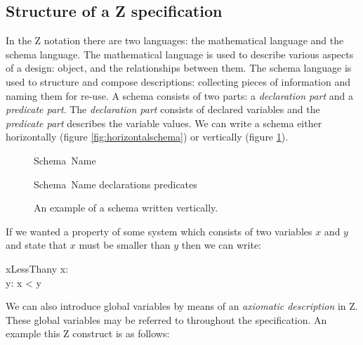 \subsection{Structure of a Z specification}

In the Z notation there are two languages: the mathematical language and the
schema language. The mathematical language is used to describe various aspects
of a design: object, and the relationships between them. The schema language is
used to structure and compose descriptions: collecting pieces of information and
naming them for re-use. A schema consists of two parts: a \emph{declaration
part} and a \emph{predicate part}. The \emph{declaration part} consists of
declared variables and the \emph{predicate part} describes the variable values.
We can write a schema either horizontally (figure \ref{fig:horizontalschema}) or
vertically (figure \ref{fig:verticalschema}).

\begin{figure}[H]
\vspace{-0.2in}
\centering
\begin{minipage}{0.45\textwidth}
\begin{zed}
\noindent Schema\ Name 
\end{zed}
\vspace{-0.18in}
\caption{An example of a schema written horizontally.\label{fig:horizontalschema}}
\vspace{-0.2in}
\end{minipage}\hfill
\begin{minipage}{0.45\textwidth}
\begin{schema}{Schema\ Name}
declarations
\where
predicates
\end{schema}
\vspace{-0.2in}
\caption{An example of a schema written vertically. \label{fig:verticalschema}}
\vspace{-0.2in}
\end{minipage}
\end{figure}

If we wanted a property of some system which consists of two variables $x$ and
$y$ and state that $x$ must be smaller than $y$ then we can write:

\begin{schema}{xLessThany}
x: \nat \\
y: \nat
\where
x < y
\end{schema}

We can also introduce global variables by means of an \textit{axiomatic
description} in Z. These global variables may be referred to throughout the
specification. An example this Z construct is as follows:

